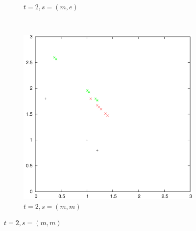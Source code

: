 \documentclass{article}
\begin{document}
\begin{figure}
\begin{subfigure}[b]{0.3\textwidth}
			\caption{$t=2, s=(m,e)$}
			\label{fig:t2s1}
		\end{subfigure}
		~
		\begin{subfigure}[b]{0.3\textwidth}
			\centering
			\includegraphics[width=\textwidth]{images/t2s3}
			\caption{$t=2, s=(m,m)$}
			\label{fig:t2s3}
		\end{subfigure}


\end{figure}
\end{document}
